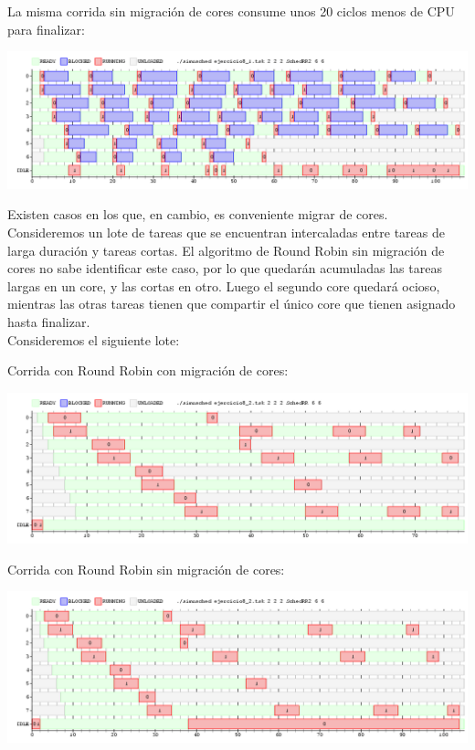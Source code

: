 La misma corrida sin migración de cores consume unos 20 ciclos menos de CPU para finalizar: \\

\begin{center}
\includegraphics[scale=0.4]{graficos/ej8_RR2_1.png}
\end{center}

Existen casos en los que, en cambio, es conveniente migrar de cores. Consideremos un lote de tareas que se encuentran intercaladas entre tareas de larga duración y tareas cortas. El algoritmo de Round Robin sin migración de cores no sabe identificar este caso, por lo que quedarán acumuladas las tareas largas en un core, y las cortas en otro. Luego el segundo core quedará ocioso, mientras las otras tareas tienen que compartir el único core que tienen asignado hasta finalizar.\\

\noindent
Consideremos el siguiente lote:


Corrida con Round Robin con migración de cores: \\

\begin{center}
\includegraphics[scale=0.4]{graficos/ej8_RR_2.png}
\end{center}

Corrida con Round Robin sin migración de cores: \\

\begin{center}
\includegraphics[scale=0.4]{graficos/ej8_RR2_2.png}
\end{center}

